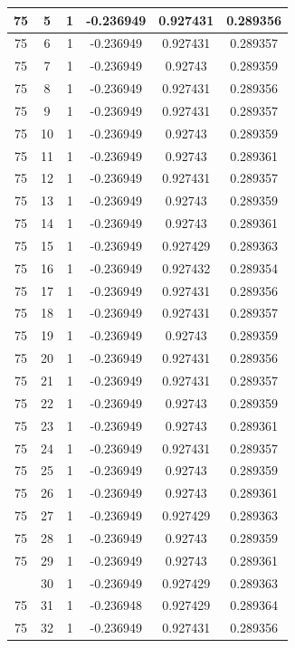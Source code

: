 \documentclass[12pt,a4paper]{article}
\numberwithin{equation}{section}
\numberwithin{figure}{section}
\numberwithin{table}{section}
\begin{document}
\begin{longtable}{|c|c|c|c|c|c|}
75 & 5 & 1 & -0.236949 & 0.927431 & 0.289356 \\ \hline
75 & 6 & 1 & -0.236949 & 0.927431 & 0.289357 \\ \hline
75 & 7 & 1 & -0.236949 & 0.92743 & 0.289359 \\ \hline
75 & 8 & 1 & -0.236949 & 0.927431 & 0.289356 \\ \hline
75 & 9 & 1 & -0.236949 & 0.927431 & 0.289357 \\ \hline
75 & 10 & 1 & -0.236949 & 0.92743 & 0.289359 \\ \hline
75 & 11 & 1 & -0.236949 & 0.92743 & 0.289361 \\ \hline
75 & 12 & 1 & -0.236949 & 0.927431 & 0.289357 \\ \hline
75 & 13 & 1 & -0.236949 & 0.92743 & 0.289359 \\ \hline
75 & 14 & 1 & -0.236949 & 0.92743 & 0.289361 \\ \hline
75 & 15 & 1 & -0.236949 & 0.927429 & 0.289363 \\ \hline
75 & 16 & 1 & -0.236949 & 0.927432 & 0.289354 \\ \hline
75 & 17 & 1 & -0.236949 & 0.927431 & 0.289356 \\ \hline
75 & 18 & 1 & -0.236949 & 0.927431 & 0.289357 \\ \hline
75 & 19 & 1 & -0.236949 & 0.92743 & 0.289359 \\ \hline
75 & 20 & 1 & -0.236949 & 0.927431 & 0.289356 \\ \hline
75 & 21 & 1 & -0.236949 & 0.927431 & 0.289357 \\ \hline
75 & 22 & 1 & -0.236949 & 0.92743 & 0.289359 \\ \hline
75 & 23 & 1 & -0.236949 & 0.92743 & 0.289361 \\ \hline
75 & 24 & 1 & -0.236949 & 0.927431 & 0.289357 \\ \hline
75 & 25 & 1 & -0.236949 & 0.92743 & 0.289359 \\ \hline
75 & 26 & 1 & -0.236949 & 0.92743 & 0.289361 \\ \hline
75 & 27 & 1 & -0.236949 & 0.927429 & 0.289363 \\ \hline
75 & 28 & 1 & -0.236949 & 0.92743 & 0.289359 \\ \hline
75 & 29 & 1 & -0.236949 & 0.92743 & 0.289361 \\ \hline
\pagebreak
75 & 30 & 1 & -0.236949 & 0.927429 & 0.289363 \\ \hline
75 & 31 & 1 & -0.236948 & 0.927429 & 0.289364 \\ \hline
75 & 32 & 1 & -0.236949 & 0.927431 & 0.289356 \\ \hline

\end{longtable}
\end{document}
